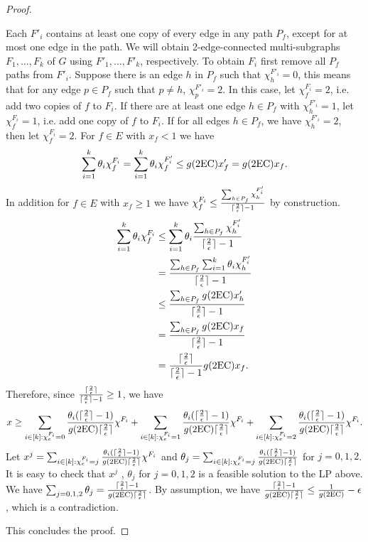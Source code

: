 \begin{proof}
\begin{cproof}
		Each $F'_i$ contains at least one copy of every edge in any path $P_f$, except for at most one edge in the path. We will obtain 2-edge-connected multi-subgraphs $F_1,\ldots,F_k$ of $G$ using $F'_1,\ldots,F'_k$, respectively. To obtain $F_i$ first remove all $P_f$ paths from $F'_i$. Suppose there is an edge $h$ in $P_f$ such that $\chi^{F'_i}_h=0$, this means that for any edge $p\in P_f$ such that $p\neq h$, $\chi^{F'_i}_p=2$. In this case, let $\chi^{F_i}_f=2$, i.e. add two copies of $f$ to $F_i$. If there are at least one edge $h\in P_f$ with $\chi^{F'_i}_h= 1$, let $\chi^{F_i}_f=1$, i.e. add one copy of $f$ to $F_i$. If for all edges $h\in P_f$, we have $\chi^{F'_i}_h=2$, then let $\chi^{F_i}_f=2$. For $f\in E$ with $x_f<1$ we have
		\begin{equation}
		\sum_{i=1}^{k}\theta_i \chi^{F_i}_f=\sum_{i=1}^{k}\theta_i \chi^{F'_i}_f\leq g(\2ec)x'_f= g(\2ec)x_f.
		\end{equation}
		In addition for $f\in E$ with $x_f\geq 1$ we have $\chi^{F_i}_f \leq \frac{\sum_{h\in P_f}\chi^{F'_i}_h}{\lceil\frac{2}{\epsilon}\rceil-1}$ by construction.
		\begin{align*}
		\sum_{i=1}^{k}\theta_i \chi^{F_i}_f&\leq \sum_{i=1}^{k}\theta_i\frac{\sum_{h\in P_f}\chi^{F'_i}_h}{\ceil{\frac{2}{\epsilon}}-1}\\
		&= \frac{\sum_{h\in P_f} \sum_{i=1}^{k}\theta_i\chi^{F'_i}_h}{\ceil{\frac{2}{\epsilon}}-1}\\
		&\leq \frac{\sum_{h\in P_f} g(\2ec)x'_h}{\ceil{\frac{2}{\epsilon}}-1}\\
		&= \frac{\sum_{h\in P_f} g(\2ec)x_f}{\ceil{\frac{2}{\epsilon}}-1}\\
		&= \frac{\ceil{\frac{2}{\epsilon}}}{\ceil{\frac{2}{\epsilon}}-1}g(\2ec)x_f.
		\end{align*}
		Therefore, since $\frac{\lceil\frac{2}{\epsilon}\rceil}{\lceil\frac{2}{\epsilon}\rceil-1}\geq 1$, we have 
		\begin{equation}
		x \geq\sum_{i\in [k]: \chi^{F_i}_e=0}\frac{\theta_i(\ceil{\frac{2}{\epsilon}}-1)}{g(\2ec)\ceil{\frac{2}{\epsilon}}}\chi^{F_i}+ \sum_{i\in [k]: \chi^{F_i}_e=1}\frac{\theta_i(\ceil{\frac{2}{\epsilon}}-1)}{g(\2ec)\ceil{\frac{2}{\epsilon}}}\chi^{F_i}+\sum_{i\in [k]: \chi^{F_i}_e=2}\frac{\theta_i(\ceil{\frac{2}{\epsilon}}-1)}{g(\2ec)\ceil{\frac{2}{\epsilon}}}\chi^{F_i}.
		\end{equation}
		Let $x^j = \sum_{i\in [k]: \chi^{F_i}_e=j}\frac{\theta_i(\ceil{\frac{2}{\epsilon}}-1)}{g(\2ec)\ceil{\frac{2}{\epsilon}}}\chi^{F_i}$ and $\theta_j =  \sum_{i\in [k]: \chi^{F_i}_e=j}\frac{\theta_i(\ceil{\frac{2}{\epsilon}}-1)}{g(\2ec)\ceil{\frac{2}{\epsilon}}}$ for $j=0,1,2$. It is easy to check that $x^j$ , $\theta_j$ for $j=0,1,2$ is a feasible solution to the LP above. We have $\sum_{j=0,1,2}\theta_j = \frac{\ceil{\frac{2}{\epsilon}}-1}{g(\2ec)\ceil{\frac{2}{\epsilon}}}$. By assumption, we have $\frac{\ceil{\frac{2}{\epsilon}}-1}{g(\2ec)\ceil{\frac{2}{\epsilon}}}\leq  \frac{1}{g(\2ec)}-\epsilon$, which is a contradiction.
	\end{cproof}
	This concludes the proof. \end{proof}
